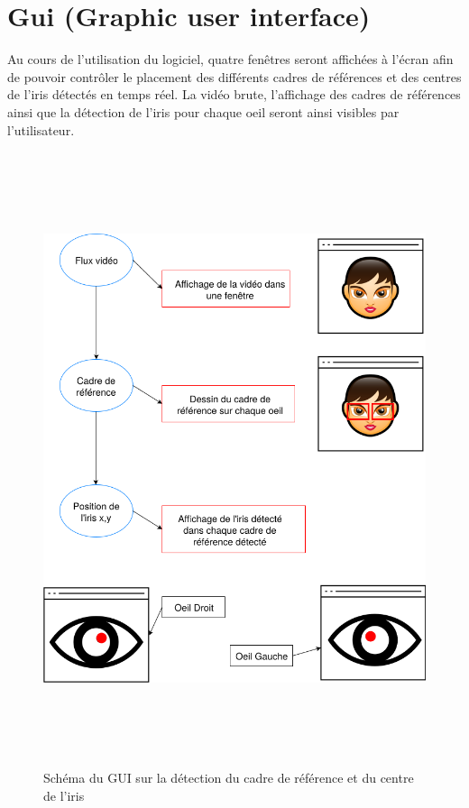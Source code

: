 \documentclass[a4paper, 12pt]{report}
\begin{document}
    \section{Gui (Graphic user interface)}
Au cours de l'utilisation du logiciel, quatre fenêtres seront affichées à l'écran afin de pouvoir contrôler le placement des différents cadres de références et des centres de l'iris détectés en temps réel. La vidéo brute, l'affichage des cadres de références ainsi que la détection de l'iris pour chaque oeil seront ainsi visibles par l'utilisateur.
    \begin{figure}[h]
    \centering\includegraphics[height=18cm]{gui.png}
    \caption{Schéma du GUI sur la détection du cadre de référence et du centre de l'iris}
    \end{figure}
    \newpage
\end{document}
